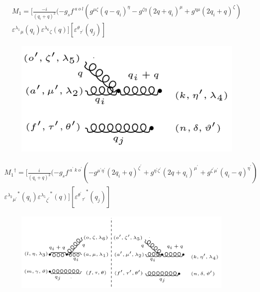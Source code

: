 \begin{equation}
\begin{split}
M_1=[\frac{-i}{(q_i +q)^2}(-g_s f^{\:a\:o\:l}(g^{{\mu}{\zeta}}(q-q_i)^{\eta}-g^{{\zeta}{\eta}}(2q +q_i)^{\mu}+g^{{\eta}{\mu}}(2q_i +q)^{\zeta})\\
{\varepsilon^{\lambda_1}}_{\mu} (q_i) {\varepsilon^{\lambda_6}}_{\zeta} (q)][{{\varepsilon^{\theta}}_{{\tau}^{\prime}}} (q_j)]
\end{split}
\end{equation}
\begin{figure}[ht!]
\centering
\includegraphics[scale=0.7]{images/GG/M1Daggergg.png}
\end{figure}
\begin{equation}
\begin{split}
{M_1}^{\dagger}=[\frac{i}{(q_i +q)^2}(-g_s f^{\:a^{\prime}\:k\: o^{\prime}}(-g^{{{\mu}^{\prime}}{{\eta}^{\prime}}}(2q_i+q)^{{\zeta}^{\prime}}+g^{{{\eta}^{\prime}}{{\zeta}^{\prime}}}(2q +q_i)^{{\mu}^{\prime}}+g^{{{\zeta}^{\prime}}{{\mu}^{\prime}}}(q_i-q)^{{\eta}^{\prime}})\\
{{\varepsilon^{\lambda_2}}_{{\mu}^{\prime}}}^* (q_i) {{\varepsilon^{\lambda_5}}_{{\zeta}^{\prime}}}^* (q)][{{\varepsilon^{{\theta}^{\prime}}}_{{\tau}^{\prime}}}^* (q_j)]
\end{split}
\end{equation}
\begin{figure}[ht!]
\centering
\includegraphics[width=0.95\textwidth]{images/GG/M1Squer.png}
\end{figure}
